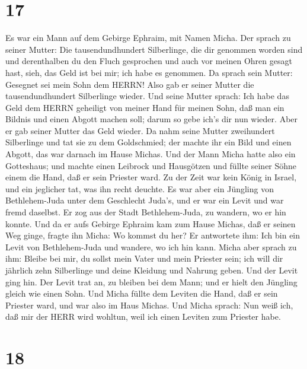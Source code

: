 \hypertarget{section-16}{%
\section{17}\label{section-16}}

 Es war ein Mann auf dem Gebirge Ephraim, mit Namen Micha.
 Der sprach zu seiner Mutter: Die tausendundhundert
Silberlinge, die dir genommen worden sind und derenthalben du den Fluch
gesprochen und auch vor meinen Ohren gesagt hast, sieh, das Geld ist bei
mir; ich habe es genommen. Da sprach sein Mutter: Gesegnet sei mein Sohn
dem HERRN!  Also gab er seiner Mutter die tausendundhundert
Silberlinge wieder. Und seine Mutter sprach: Ich habe das Geld dem HERRN
geheiligt von meiner Hand für meinen Sohn, daß man ein Bildnis und einen
Abgott machen soll; darum so gebe ich's dir nun wieder. 
Aber er gab seiner Mutter das Geld wieder. Da nahm seine Mutter
zweihundert Silberlinge und tat sie zu dem Goldschmied; der machte ihr
ein Bild und einen Abgott, das war darnach im Hause Michas. 
Und der Mann Micha hatte also ein Gotteshaus; und machte einen Leibrock
und Hausgötzen und füllte seiner Söhne einem die Hand, daß er sein
Priester ward.  Zu der Zeit war kein König in Israel, und
ein jeglicher tat, was ihn recht deuchte.  Es war aber ein
Jüngling von Bethlehem-Juda unter dem Geschlecht Juda's, und er war ein
Levit und war fremd daselbst.  Er zog aus der Stadt
Bethlehem-Juda, zu wandern, wo er hin konnte. Und da er aufs Gebirge
Ephraim kam zum Hause Michas, daß er seinen Weg ginge, 
fragte ihn Micha: Wo kommst du her? Er antwortete ihm: Ich bin ein Levit
von Bethlehem-Juda und wandere, wo ich hin kann.  Micha
aber sprach zu ihm: Bleibe bei mir, du sollst mein Vater und mein
Priester sein; ich will dir jährlich zehn Silberlinge und deine Kleidung
und Nahrung geben. Und der Levit ging hin.  Der Levit trat
an, zu bleiben bei dem Mann; und er hielt den Jüngling gleich wie einen
Sohn.  Und Micha füllte dem Leviten die Hand, daß er sein
Priester ward, und war also im Haus Michas.  Und Micha
sprach: Nun weiß ich, daß mir der HERR wird wohltun, weil ich einen
Leviten zum Priester habe.

\hypertarget{section-17}{%
\section{18}\label{section-17}}

